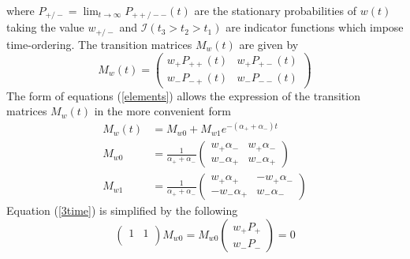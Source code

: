 \documentclass[%
 amsmath,amssymb,
]{revtex4-2}
\begin{document}
where $P_{+/-}=\lim_{t \to \infty} P_{++/--}(t)$ are the stationary probabilities of $w(t)$ taking the value $w_{+/-}$ and $\mathcal{I}(t_3>t_2>t_1)$ are indicator functions which impose time-ordering. The transition matrices $M_{w}(t)$ are given by
\begin{equation}
    M_{w}(t) = \begin{pmatrix}
w_+P_{++}(t) & w_+P_{+-}(t) \\
w_-P_{-+}(t)  & w_-P_{--}(t)
\end{pmatrix}
\end{equation}
The form of equations (\ref{elements}) allows the expression of the transition matrices $M_w(t)$ in the more convenient form
\begin{equation}
\begin{split}
        M_{w}(t) &= M_{w0} + M_{w1}e^{-(\alpha_+ + \alpha_-)t} \\
        M_{w0} &= \frac{1}{\alpha_+ + \alpha_-} \begin{pmatrix}
        w_+\alpha_- & w_+\alpha_- \\
        w_-\alpha_+ & w_-\alpha_+
        \end{pmatrix} \\
        M_{w1} &= \frac{1}{\alpha_+ + \alpha_-} \begin{pmatrix}
        w_+\alpha_+ & -w_+\alpha_- \\
        -w_-\alpha_+ & w_-\alpha_-
        \end{pmatrix}
\end{split}
\end{equation}
Equation (\ref{3time}) is simplified by the following
\begin{equation}\label{3time2}
     \begin{pmatrix}
1 & 1\\
\end{pmatrix}M_{w0} = M_{w0}
\begin{pmatrix}
w_+P_{+}\\
w_-P_{-}
\end{pmatrix} = 0
\end{equation}
\end{document}
